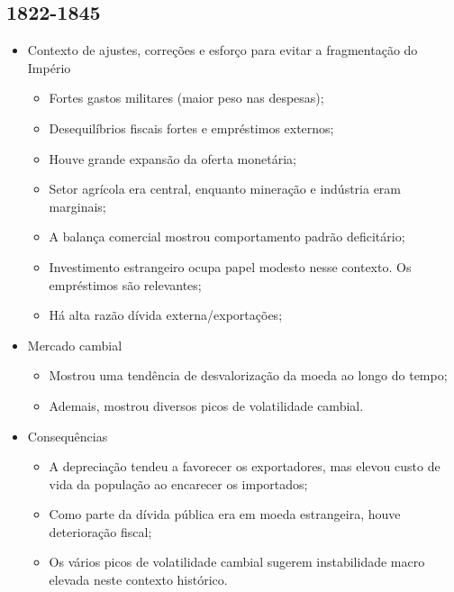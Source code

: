 \documentclass[a4paper,12pt]{article}[abntex2]
\begin{document}
\subsection{\textbf{1822-1845}}
\begin{itemize}
    \item  Contexto de ajustes, correções e esforço para evitar a fragmentação do
Império
\begin{itemize}
    \item Fortes gastos militares (maior peso nas despesas);
\end{itemize}
\begin{itemize}
    \item Desequilíbrios fiscais fortes e empréstimos externos;
\end{itemize}
\begin{itemize}
    \item  Houve grande expansão da oferta monetária;
\end{itemize}
\begin{itemize}
    \item Setor agrícola era central, enquanto mineração e indústria eram marginais;
\end{itemize}
\begin{itemize}
    \item A balança comercial mostrou comportamento padrão deficitário;
\end{itemize}
\begin{itemize}
    \item Investimento estrangeiro ocupa papel modesto nesse contexto. Os empréstimos são relevantes;
\end{itemize}
\begin{itemize}
    \item Há alta razão dívida externa/exportações;
\end{itemize}
\item Mercado cambial
\begin{itemize}
    \item Mostrou uma tendência de desvalorização da moeda ao longo do tempo;
\end{itemize}
\begin{itemize}
    \item Ademais, mostrou diversos picos de volatilidade cambial.
\end{itemize}
\item Consequências
\begin{itemize}
    \item A depreciação tendeu a favorecer os exportadores, mas elevou  custo de vida da população ao encarecer os importados;
\end{itemize}
\begin{itemize}
    \item Como parte da dívida pública era em moeda estrangeira, houve deterioração fiscal;
\end{itemize}
\begin{itemize}
    \item  Os vários picos de volatilidade cambial sugerem instabilidade macro elevada neste contexto histórico.
\end{itemize}
\end{itemize}
\end{document}
